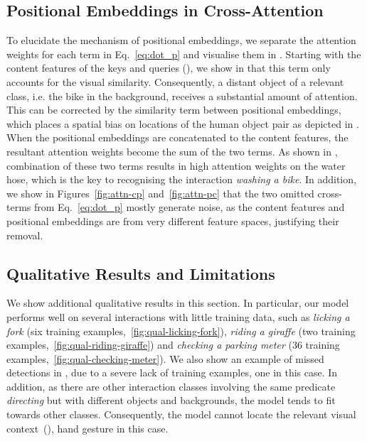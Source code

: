 \documentclass[10pt,twocolumn,letterpaper]{article}
\begin{document}
\subsection{Positional Embeddings in Cross-Attention}

To elucidate the mechanism of positional embeddings, we separate the attention weights for each term in Eq.~\ref{eq:dot_p} and visualise them in . Starting with the content features of the keys and queries (), we show in  that this term only accounts for the visual similarity. Consequently, a distant object of a relevant class, i.e. the bike in the background, receives a substantial amount of attention. This can be corrected by the similarity term between positional embeddings, which places a spatial bias on locations of the human object pair as depicted in . When the positional embeddings are concatenated to the content features, the resultant attention weights become the sum of the two terms. As shown in , combination of these two terms results in high attention weights on the water hose, which is the key to recognising the interaction \textit{washing a bike}. In addition, we show in Figures~\ref{fig:attn-cp} and~\ref{fig:attn-pc} that the two omitted cross-terms from Eq.~\ref{eq:dot_p} mostly generate noise, as the content features and positional embeddings are from very different feature spaces, justifying their removal.

\subsection{Qualitative Results and Limitations}

We show additional qualitative results in this section. In particular, our model performs well on several interactions with little training data, such as \textit{licking a fork} (six training examples,~\ref{fig:qual-licking-fork}), \textit{riding a giraffe} (two training examples,~\ref{fig:qual-riding-giraffe}) and \textit{checking a parking meter} (36 training examples,~\ref{fig:qual-checking-meter}). We also show an example of missed detections in , due to a severe lack of training examples, one in this case. In addition, as there are other interaction classes involving the same predicate \textit{directing} but with different objects and backgrounds, the model tends to fit towards other classes. Consequently, the model cannot locate the relevant visual context~(), hand gesture in this case.
\end{document}
